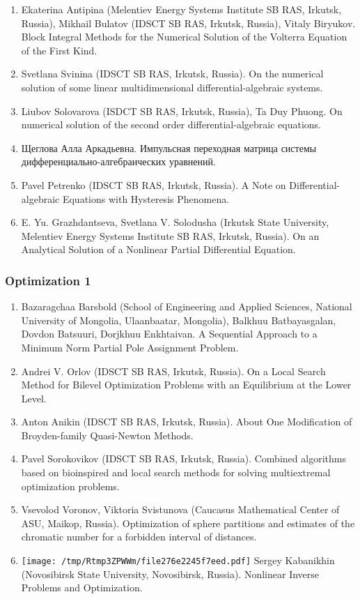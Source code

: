 \documentclass[
]{article}
\providecommand{\tightlist}{%
  \setlength{\itemsep}{0pt}\setlength{\parskip}{0pt}}
\begin{document}
\begin{enumerate}
\def\labelenumi{\arabic{enumi}.}
\tightlist
\item
  Ekaterina Antipina (Melentiev Energy Systems Institute SB RAS,
  Irkutsk, Russia), Mikhail Bulatov (IDSCT SB RAS, Irkutsk, Russia),
  Vitaly Biryukov. Block Integral Methods for the Numerical Solution of
  the Volterra Equation of the First Kind.
\item
  Svetlana Svinina (IDSCT SB RAS, Irkutsk, Russia). On the numerical
  solution of some linear multidimensional differential-algebraic
  systems.
\item
  Liubov Solovarova (ISDCT SB RAS, Irkutsk, Russia), Ta Duy Phuong. On
  numerical solution of the second order differential-algebraic
  equations.
\item
  Щеглова Алла Аркадьевна. Импульсная переходная матрица системы
  дифференциально-алгебраических уравнений.
\item
  Pavel Petrenko (IDSCT SB RAS, Irkutsk, Russia). A Note on
  Differential-algebraic Equations with Hysteresis Phenomena.
\item
  E. Yu. Grazhdantseva, Svetlana V. Solodusha (Irkutsk State University,
  Melentiev Energy Systems Institute SB RAS, Irkutsk, Russia). On an
  Analytical Solution of a Nonlinear Partial Differential Equation.
\end{enumerate}

\hypertarget{o1}{%
\subsubsection{Optimization 1}\label{o1}}

\begin{enumerate}
\def\labelenumi{\arabic{enumi}.}
\tightlist
\item
  Bazaragchaa Barsbold (School of Engineering and Applied Sciences,
  National University of Mongolia, Ulaanbaatar, Mongolia), Balkhuu
  Batbayasgalan, Dovdon Batsuuri, Dorjkhuu Enkhtaivan. A Sequential
  Approach to a Minimum Norm Partial Pole Assignment Problem.
\item
  Andrei V. Orlov (IDSCT SB RAS, Irkutsk, Russia). On a Local Search
  Method for Bilevel Optimization Problems with an Equilibrium at the
  Lower Level.
\item
  Anton Anikin (IDSCT SB RAS, Irkutsk, Russia). About One Modification
  of Broyden-family Quasi-Newton Methods.
\item
  Pavel Sorokovikov (IDSCT SB RAS, Irkutsk, Russia). Combined algorithms
  based on bioinspired and local search methods for solving
  multiextremal optimization problems.
\item
  Vsevolod Voronov, Viktoria Svistunova (Caucasus Mathematical Center of
  ASU, Maikop, Russia). Optimization of sphere partitions and estimates
  of the chromatic number for a forbidden interval of distances.
\item
  \protect\texttt{[image: /tmp/Rtmp3ZPWWm/file276e2245f7eed.pdf]}
  Sergey Kabanikhin (Novosibirsk State University, Novosibirsk, Russia).
  Nonlinear Inverse Problems and Optimization.
\end{enumerate}
\end{document}
